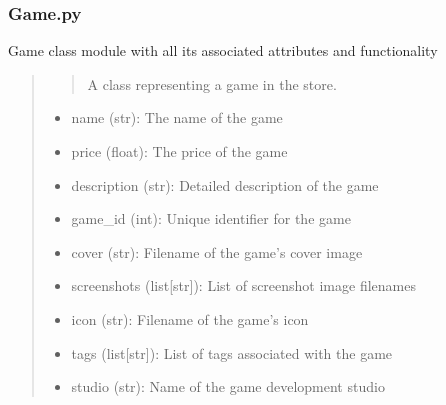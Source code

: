 \documentclass[letterpaper,10pt,english]{sphinxmanual}
\begin{document}
\subsubsection{Game.py}
\label{\detokenize{store-service:game-py}}
\sphinxAtStartPar
Game class module with all its associated attributes and functionality
\begin{quote}
\begin{description}
\begin{quote}

\sphinxAtStartPar
A class representing a game in the store.
\end{quote}
\begin{description}
\begin{itemize}
\item {} 
\sphinxAtStartPar
name (str): The name of the game

\item {} 
\sphinxAtStartPar
price (float): The price of the game

\item {} 
\sphinxAtStartPar
description (str): Detailed description of the game

\item {} 
\sphinxAtStartPar
game\_id (int): Unique identifier for the game

\item {} 
\sphinxAtStartPar
cover (str): Filename of the game’s cover image

\item {} 
\sphinxAtStartPar
screenshots (list{[}str{]}): List of screenshot image filenames

\item {} 
\sphinxAtStartPar
icon (str): Filename of the game’s icon

\item {} 
\sphinxAtStartPar
tags (list{[}str{]}): List of tags associated with the game

\item {} 
\sphinxAtStartPar
studio (str): Name of the game development studio

\end{itemize}

\end{description}

\end{description}
\end{quote}
\end{document}
